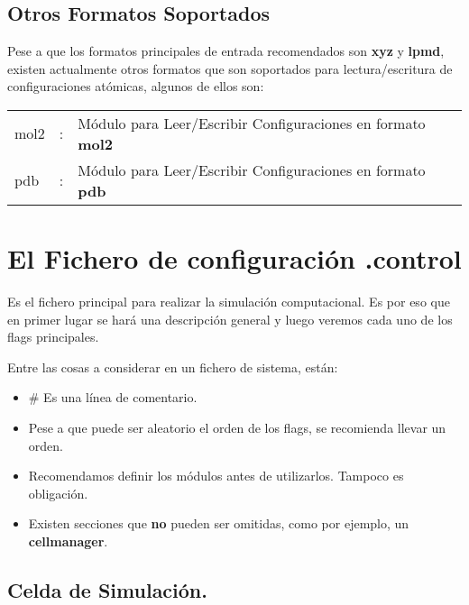 \documentclass[a4paper,10pt]{scrbook}
\begin{document}
\subsection{Otros Formatos Soportados}

Pese a que los formatos principales de entrada recomendados son \textbf{xyz} y \textbf{lpmd}, existen actualmente otros formatos que son soportados para lectura/escritura de configuraciones at\'omicas, algunos de ellos son:

\begin{tabular}{lcl}\\
 mol2 &:& M\'odulo para Leer/Escribir Configuraciones en formato \textbf{mol2} \\
 pdb  &:& M\'odulo para Leer/Escribir Configuraciones en formato \textbf{pdb} \\
\end{tabular}



\section{El Fichero de configuraci\'on .control}

Es el fichero principal para realizar la simulaci\'on computacional. Es por eso que en primer lugar se har\'a una descripci\'on general y luego veremos cada uno de los flags principales.

Entre las cosas a considerar en un fichero de sistema, est\'an:

\begin{itemize}
 \item \# Es una l\'inea de comentario.
 \item Pese a que puede ser aleatorio el orden de los flags, se recomienda llevar un orden.
 \item Recomendamos definir los m\'odulos antes de utilizarlos. Tampoco es obligaci\'on.
 \item Existen secciones que \textbf{no} pueden ser omitidas, como por ejemplo, un \textbf{cellmanager}.
\end{itemize}

\subsection{Celda de Simulaci\'on.}
\end{document}
